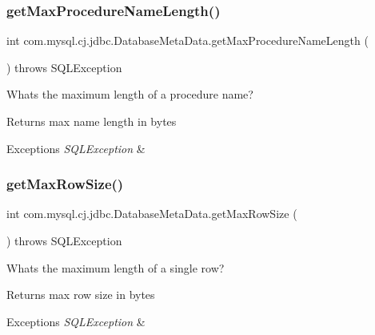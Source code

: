 \subsubsection{\texorpdfstring{get\+Max\+Procedure\+Name\+Length()}{getMaxProcedureNameLength()}}
{\footnotesize\ttfamily int com.\+mysql.\+cj.\+jdbc.\+Database\+Meta\+Data.\+get\+Max\+Procedure\+Name\+Length (\begin{DoxyParamCaption}{ }\end{DoxyParamCaption}) throws S\+Q\+L\+Exception}

What\textquotesingle{}s the maximum length of a procedure name?

\begin{DoxyReturn}{Returns}
max name length in bytes 
\end{DoxyReturn}

\begin{DoxyExceptions}{Exceptions}
{\em S\+Q\+L\+Exception} & \\
\hline
\end{DoxyExceptions}
\mbox{\label{classcom_1_1mysql_1_1cj_1_1jdbc_1_1_database_meta_data_ad4f6654c296ca5239cbe62b036363df3}} 
\subsubsection{\texorpdfstring{get\+Max\+Row\+Size()}{getMaxRowSize()}}
{\footnotesize\ttfamily int com.\+mysql.\+cj.\+jdbc.\+Database\+Meta\+Data.\+get\+Max\+Row\+Size (\begin{DoxyParamCaption}{ }\end{DoxyParamCaption}) throws S\+Q\+L\+Exception}

What\textquotesingle{}s the maximum length of a single row?

\begin{DoxyReturn}{Returns}
max row size in bytes 
\end{DoxyReturn}

\begin{DoxyExceptions}{Exceptions}
{\em S\+Q\+L\+Exception} & \\
\hline
\end{DoxyExceptions}
\mbox{\label{classcom_1_1mysql_1_1cj_1_1jdbc_1_1_database_meta_data_a5173b480262679925fc705e1efd9b7f2}} 
